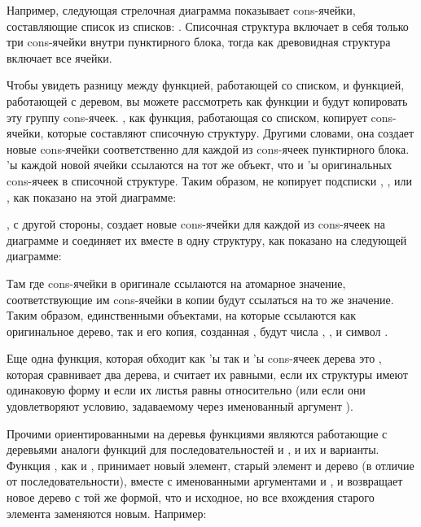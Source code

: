 Например, следующая стрелочная диаграмма показывает cons-ячейки, составляющие список из
списков: . Списочная структура включает в себя только три
cons-ячейки внутри пунктирного блока, тогда как древовидная структура включает все ячейки.


Чтобы увидеть разницу между функцией, работающей со списком, и функцией, работающей с
деревом, вы можете рассмотреть как функции  и  будут
копировать эту группу cons-ячеек. , как функция, работающая со списком,
копирует cons-ячейки, которые составляют списочную структуру. Другими словами, она создает
новые cons-ячейки соответственно для каждой из cons-ячеек пунктирного блока. 'ы
каждой новой ячейки ссылаются на тот же объект, что и 'ы оригинальных cons-ячеек
в списочной структуре. Таким образом,  не копирует подсписки , , или , как показано на этой диаграмме:


, с другой стороны, создает новые cons-ячейки для каждой из cons-ячеек на
диаграмме и соединяет их вместе в одну структуру, как показано на следующей диаграмме:


Там где cons-ячейки в оригинале ссылаются на атомарное значение, соответствующие им
cons-ячейки в копии будут ссылаться на то же значение.  Таким образом, единственными
объектами, на которые ссылаются как оригинальное дерево, так и его копия, созданная
, будут числа , , и символ .

Еще одна функция, которая обходит как 'ы так и 'ы cons-ячеек дерева
это , которая сравнивает два дерева, и считает их равными, если их
структуры имеют одинаковую форму и если их листья равны относительно  (или если
они удовлетворяют условию, задаваемому через именованный аргумент ).

Прочими ориентированными на деревья функциями являются работающие с деревьями аналоги
функций для последовательностей  и , и их  и
 варианты. Функция , как и , принимает новый
элемент, старый элемент и дерево (в отличие от последовательности), вместе с именованными
аргументами  и , и возвращает новое дерево с той же формой, что и
исходное, но все вхождения старого элемента заменяются новым. Например:

